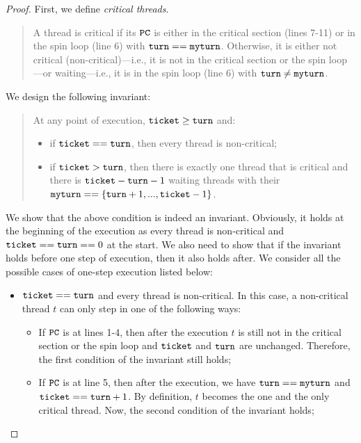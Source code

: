 \documentclass{article}[10pt]
\newcommand{\kwd}[1]{\ensuremath{\text{\ttfamily #1}}\xspace}
\def\kturn{\kwd{turn}}
\def\kmyturn{\kwd{myturn}}
\def\kticket{\kwd{ticket}}
\begin{document}
\begin{proof}
  First, we define \emph{critical threads}. 
  \begin{quote}
    A thread is critical if its \kwd{PC} is either in the critical
    section (lines 7-11) or in the spin loop (line 6) with $\kturn ==
    \kmyturn$. Otherwise, it is either not critical
    (non-critical)---i.e., it is not in the critical section or the
    spin loop---or waiting---i.e., it is in the spin loop (line 6)
    with $\kturn \not= \kmyturn$.
  \end{quote}
  We design the following invariant:
  \begin{quote}
    At any point of execution, $\kticket \geq \kturn$ and:
    \begin{itemize}
    \item if $\kticket == \kturn$, then every thread is non-critical;
    \item if $\kticket > \kturn$, then there is exactly one thread
      that is critical and there is $\kticket - \kturn - 1$ waiting
      threads with their $\kmyturn == \{\kturn+1,...,\kticket - 1\}$.
    \end{itemize}
  \end{quote}
  We show that the above condition is indeed an
  invariant. Obviously, it holds at the beginning of the execution as
  every thread is non-critical and $\kticket == \kturn == 0$ at the
  start. We also need to show that if the invariant holds before one
  step of execution, then it also holds after. We consider all the
  possible cases of one-step execution listed below:
  \begin{itemize}
  \item $\kticket == \kturn$ and every thread is non-critical. In this
    case, a non-critical thread $t$ can only step in one of the
    following ways:
    \begin{itemize}
    \item If \kwd{PC} is at lines 1-4, then after the execution $t$ is
      still not in the critical section or the spin loop and \kticket
      and \kturn are unchanged. Therefore, the first condition of the
      invariant still holds;

    \item If \kwd{PC} is at line 5, then after the execution, we have
      $\kturn == \kmyturn$ and $\kticket == \kturn + 1$. By
      definition, $t$ becomes the one and the only critical
      thread. Now, the second condition of the invariant holds;


\end{itemize}
\end{itemize}
\end{proof}
\end{document}
